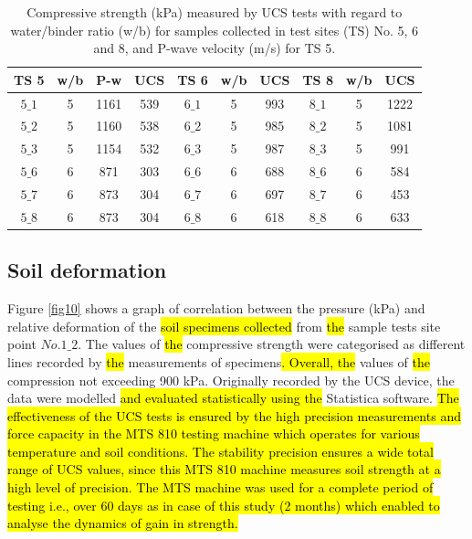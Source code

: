 \documentclass[sustainability,article,submit,pdftex,moreauthors]{Definitions/mdpi}
\begin{document}
\begin{table}[H] 
\caption{Compressive strength (kPa) measured by UCS tests with regard to water/binder ratio (w/b) for samples collected in test sites (TS) No. 5, 6 and 8, and P-wave velocity (m/s) for TS 5.\label{tab04}}
\begin{tabularx}{\textwidth}{CCCC|CCC|CCC }
\toprule
\textbf{TS 5} & \textbf{w/b} & P-w & \textbf{UCS} & \textbf{TS 6} & \textbf{w/b} & \textbf{UCS} & \textbf{TS 8} & \textbf{w/b} & \textbf{UCS}\\
\midrule
$5\_1$ & 5 & 1161 & 539 & $6\_1$ & 5 & 993 & $8\_1$ & 5 & 1222 \\
$5\_2$ & 5 & 1160 & 538 & $6\_2$ & 5 & 985 & $8\_2$ & 5 & 1081 \\
$5\_3$ & 5 & 1154 & 532 & $6\_3$ & 5 & 987 & $8\_3$ & 5 & 991 \\
$5\_6$ & 6 & 871 & 303 & $6\_6$ & 6 & 688 & $8\_6$ & 6 & 584 \\
$5\_7$ & 6 & 873 & 304 & $6\_7$ & 6 & 697 & $8\_7$ & 6 & 453 \\
$5\_8$ & 6 & 873 & 304 & $6\_8$ & 6 & 618 & $8\_8$ & 6 & 633 \\
\bottomrule
\end{tabularx}
\end{table}
\subsection{Soil deformation}

Figure \ref{fig10} shows a graph of correlation between the pressure (kPa) and relative deformation of the \hl{soil specimens collected} from \hl{the }sample tests site point $No. 1\_2$. The values of \hl{the }compressive strength were categorised as different lines recorded by \hl{the }measurements of specimens\hl{. Overall, the }values of \hl{the }compression not exceeding 900 kPa. Originally recorded by the UCS device, the data were modelled \hl{and evaluated statistically using the} Statistica software. \hl{The effectiveness of the UCS tests is ensured by the high precision measurements and force capacity in the MTS 810 testing machine which operates for various temperature and soil conditions. The stability precision ensures a wide total range of UCS values, since this MTS 810 machine measures soil strength at a high level of precision. The MTS machine was used for a complete period of testing i.e., over 60 days as in case of this study (2 months) which enabled to analyse the dynamics of gain in strength. }
\end{document}
